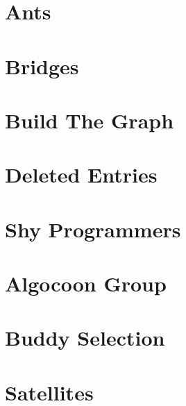 \documentclass[a4paper, 10pt]{article}
\let\stdsection\section
\renewcommand\section{\newpage\stdsection}
\newcommand{\includecode}[1]{
    }
\newcommand{\algoAuthor}{2} %
\begin{document}
              
    \section{Ants}
        \label{sec:ants}
        \includecode{../problems/w04/Ants/Ants\algoAuthor.cpp}
        
    \section{Bridges}
        \label{sec:bridges}
        \includecode{../problems/w04/Bridges/Bridges\algoAuthor.cpp}
        
    \section{Build The Graph}
        \label{sec:build_the_graph}
        \includecode{../problems/w04/Build_The_Graph/BuildTheGraph\algoAuthor.cpp}
        
    \section{Deleted Entries}
        \label{sec:deleted_entries}
        \includecode{../problems/w04/Deleted_Entries/DeletedEntries\algoAuthor.cpp}
    
    \section{Shy Programmers}
        \label{sec:shy_programmers}
        \includecode{../problems/w04/Shy_Programmers/ShyProgrammers\algoAuthor.cpp}

    
    \section{Algocoon Group}
        \label{sec:algocoon}
        \includecode{../problems/w05/Algocoon/Algocoon\algoAuthor.cpp}
        
    \section{Buddy Selection}
        \label{sec:buddy_selection}
        \includecode{../problems/w05/Buddies/Buddies\algoAuthor.cpp}
        
    \section{Satellites}
        \label{sec:satellites}
        \includecode{../problems/w05/Satellites/Satellites\algoAuthor.cpp}
        
\end{document}

